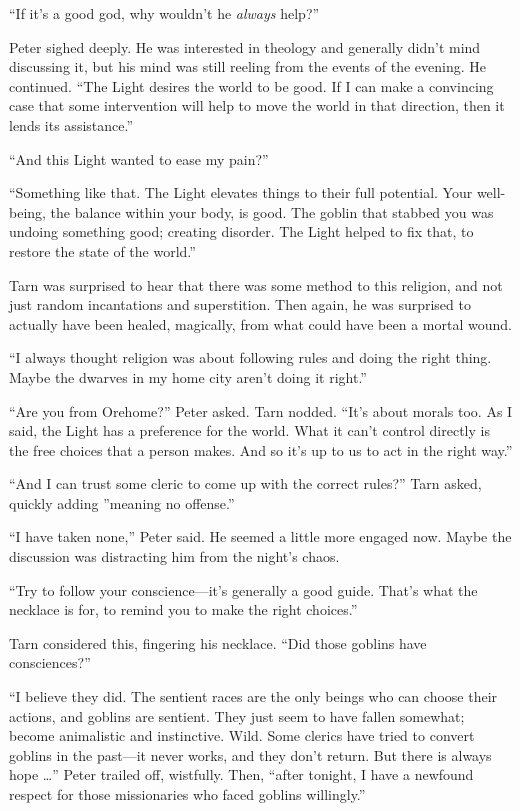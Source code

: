``If it's a good god, why wouldn't he \emph{always} help?''

Peter sighed deeply.  He was interested in theology and generally didn't mind discussing it, but his mind was still reeling from the events of the evening.
He continued.  ``The Light desires the world to be good.  If I can make a convincing case that some intervention will help to move the world in that direction, then it lends its assistance.''

``And this Light wanted to ease my pain?''

``Something like that.  The Light elevates things to their full potential.  Your well-being, the balance within your body, is good.  The goblin that stabbed you was undoing something good; creating disorder.  The Light helped to fix that, to restore the state of the world.''

Tarn was surprised to hear that there was some method to this religion, and not just random incantations and superstition.  Then again, he was surprised to actually have been healed, magically, from what could have been a mortal wound.

``I always thought religion was about following rules and doing the right thing.  Maybe the dwarves in my home city aren't doing it right.''

``Are you from Orehome?'' Peter asked.  Tarn nodded.  ``It's about morals too.  As I said, the Light has a preference for the world.  What it can't control directly is the free choices that a person makes.  And so it's up to us to act in the right way.''

``And I can trust some cleric to come up with the correct rules?'' Tarn asked, quickly adding ''meaning no offense.''

``I have taken none,'' Peter said.  He seemed a little more engaged now.  Maybe the discussion was distracting him from the night's chaos.

``Try to follow your conscience---it's generally a good guide.  That's what the necklace is for, to remind you to make the right choices.''

Tarn considered this, fingering his necklace.  ``Did those goblins have consciences?''

``I believe they did.  The sentient races are the only beings who can choose their actions, and goblins are sentient.  They just seem to have fallen somewhat; become animalistic and instinctive.  Wild.  Some clerics have tried to convert goblins in the past---it never works, and they don't return.  But there is always hope \ldots'' Peter trailed off, wistfully.  Then, ``after tonight, I have a newfound respect for those missionaries who faced goblins willingly.''

